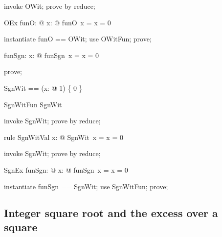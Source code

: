 \documentclass{article}
\begin{document}
\begin{zproof}
invoke OWit;
prove by reduce;
\end{zproof}

\begin{theorem}{OEx}
  \exists funO: \nat \fun \nat @ \forall x: \nat @ funO~x = \IF x = 0  
\end{theorem}

\begin{zproof}
instantiate funO == OWit;
use OWitFun;
prove;
\end{zproof}

\begin{axdef}
  funSgn: \nat \fun \nat
\where
   \forall x: \nat @ funSgn~x = \IF x = 0  
\end{axdef}

\begin{zproof}
prove;
\end{zproof}

\begin{zed}
  SgnWit == (\lambda x: \nat @ 1) \oplus \{ 0  \}
\end{zed}

\begin{theorem}{SgnWitFun}
  SgnWit \in \nat \fun \nat
\end{theorem}

\begin{zproof}
invoke SgnWit;
prove by reduce;
\end{zproof}

\begin{theorem}{rule SgnWitVal}
  \forall x: \nat @ SgnWit~x = \IF x = 0  
\end{theorem}

\begin{zproof}
invoke SgnWit;
prove by reduce;
\end{zproof}

\begin{theorem}{SgnEx}
  \exists funSgn: \nat \fun \nat @ \forall x: \nat @ funSgn~x = \IF x = 0  
\end{theorem}

\begin{zproof}
instantiate funSgn == SgnWit;
use SgnWitFun;
prove;
\end{zproof}

\subsection{Integer square root and the excess over a square}
\end{document}
